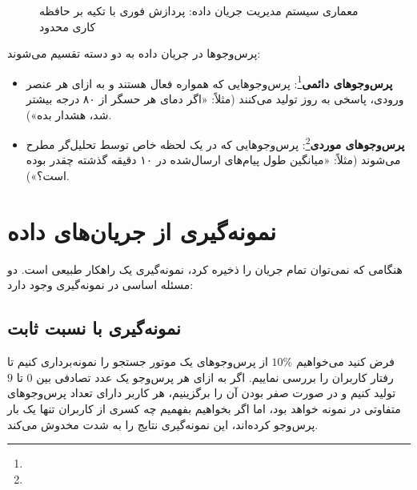 \begin{figure}[H]
\centering
{}
\caption{معماری سیستم مدیریت جریان داده: پردازش فوری با تکیه بر حافظه کاری محدود}
\label{fig:stream-model}
\end{figure}

پرس‌وجوها در جریان داده به دو دسته تقسیم می‌شوند:
\begin{itemize}
    \item \textbf{پرس‌وجوهای دائمی}\footnote{}: پرس‌وجوهایی که همواره فعال هستند و به ازای هر عنصر ورودی، پاسخی به روز تولید می‌کنند (مثلاً: «اگر دمای هر حسگر از ۸۰ درجه بیشتر شد، هشدار بده»).
    \item \textbf{پرس‌وجوهای موردی}\footnote{}: پرس‌وجوهایی که در یک لحظه خاص توسط تحلیل‌گر مطرح می‌شوند (مثلاً: «میانگین طول پیام‌های ارسال‌شده در ۱۰ دقیقه گذشته چقدر بوده است؟»).
\end{itemize}

\section{نمونه‌گیری از جریان‌های داده}
هنگامی که نمی‌توان تمام جریان را ذخیره کرد، نمونه‌گیری یک راهکار طبیعی است. دو مسئله اساسی در نمونه‌گیری وجود دارد:

\subsection{نمونه‌گیری با نسبت ثابت \texorpdfstring{}{(Fixed Proportion Sampling)}}
فرض کنید می‌خواهیم $10\%$ از پرس‌وجوهای یک موتور جستجو را نمونه‌برداری کنیم تا رفتار کاربران را بررسی نماییم.
اگر به ازای هر پرس‌وجو یک عدد تصادفی بین $0$ تا $9$ تولید کنیم و در صورت صفر بودن آن را برگزینیم، هر کاربر دارای تعداد پرس‌وجوهای متفاوتی در نمونه خواهد بود، اما اگر بخواهیم بفهمیم چه کسری از کاربران تنها یک بار پرس‌وجو کرده‌اند، این نمونه‌گیری نتایج را به شدت مخدوش می‌کند.

